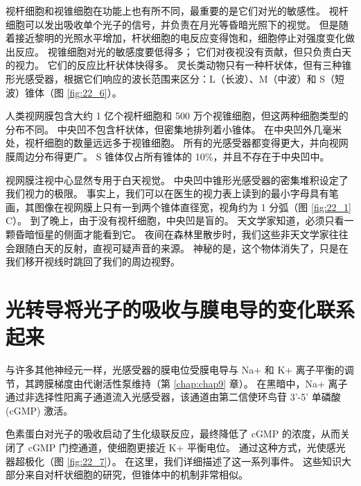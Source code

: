 视杆细胞和视锥细胞在功能上也有所不同，最重要的是它们对光的敏感性。 
视杆细胞可以发出吸收单个光子的信号，并负责在月光等昏暗光照下的视觉。 
但是随着接近黎明的光照水平增加，杆状细胞的电反应变得饱和，细胞停止对强度变化做出反应。 
视锥细胞对光的敏感度要低得多； 它们对夜视没有贡献，但只负责白天的视力。 
它们的反应比杆状体快得多。 
灵长类动物只有一种杆状体，但有三种锥形光感受器，根据它们响应的波长范围来区分：L（长波）、M（中波）和 S（短波）锥体（图 \ref{fig:22_6}）。


人类视网膜包含大约 1 亿个视杆细胞和 500 万个视锥细胞，但这两种细胞类型的分布不同。 
中央凹不包含杆状体，但密集地排列着小锥体。 
在中央凹外几毫米处，视杆细胞的数量远远多于视锥细胞。 
所有的光感受器都变得更大，并向视网膜周边分布得更广。 
S 锥体仅占所有锥体的 10\%，并且不存在于中央凹中。


视网膜注视中心显然专用于白天视觉。 
中央凹中锥形光感受器的密集堆积设定了我们视力的极限。 
事实上，我们可以在医生的视力表上读到的最小字母具有笔画，其图像在视网膜上只有一到两个锥体直径宽，视角约为 1 分弧（图 \ref{fig:22_1} C）。 
到了晚上，由于没有视杆细胞，中央凹是盲的。 
天文学家知道，必须只看一颗昏暗恒星的侧面才能看到它。 
夜间在森林里散步时，我们这些非天文学家往往会跟随白天的反射，直视可疑声音的来源。 
神秘的是，这个物体消失了，只是在我们移开视线时跳回了我们的周边视野。


\section{光转导将光子的吸收与膜电导的变化联系起来}
与许多其他神经元一样，光感受器的膜电位受膜电导与 Na+ 和 K+ 离子平衡的调节，其跨膜梯度由代谢活性泵维持（第 \ref{chap:chap9} 章）。 
在黑暗中，Na+ 离子通过非选择性阳离子通道流入光感受器，该通道由第二信使环鸟苷 3'-5' 单磷酸 (cGMP) 激活。


色素蛋白对光子的吸收启动了生化级联反应，最终降低了 cGMP 的浓度，从而关闭了 cGMP 门控通道，使细胞更接近 K+ 平衡电位。 
通过这种方式，光使感光器超极化（图 \ref{fig:22_7}）。 
在这里，我们详细描述了这一系列事件。 这些知识大部分来自对杆状细胞的研究，但锥体中的机制非常相似。

